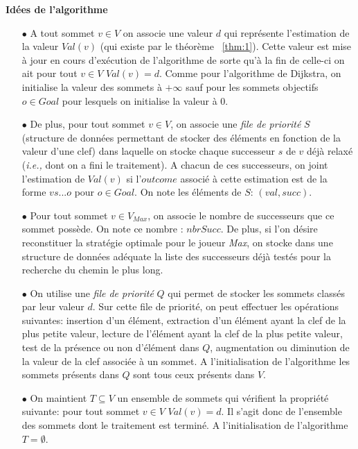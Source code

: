 \noindent \textbf{Idées de l'algorithme}\\

\begin{enumerate}
	
	\item[$\bullet$] A tout sommet $v \in V$ on associe une valeur $d$ qui représente l'estimation de la valeur $Val(v)$ (qui existe par le théorème ~\ref{thm:1}). Cette valeur est mise à jour en cours d'exécution de l'algorithme de sorte qu'à la fin de celle-ci on ait pour tout $v \in V$ $Val(v) = d$. Comme pour l'algorithme de Dijkstra, on initialise la valeur des sommets à $+\infty$ sauf pour les sommets objectifs $o \in Goal$ pour lesquels on initialise la valeur à 0.
	
	\item[$\bullet$] De plus, pour tout sommet $v \in V$, on associe une \textit{file de priorité} $S$ (structure de données permettant de stocker des éléments en fonction de la valeur d'une clef) dans laquelle on stocke chaque successeur $s$ de $v$ déjà relaxé (\emph{i.e.,} dont on a fini le traitement). A chacun de ces successeurs, on joint l'estimation de  $Val(v)$ si l'$outcome$ associé à cette estimation est de la forme $v s ... o$ pour $o \in Goal$. On note les éléments de $S$: $(val,succ)$.
	
	\item[$\bullet$] Pour tout sommet $v \in V_{Max}$, on associe le nombre de successeurs que ce sommet possède. On note ce nombre : $nbrSucc$. De plus, si l'on désire reconstituer la stratégie optimale pour le joueur \textit{Max}, on stocke dans une structure de données adéquate la liste des successeurs déjà testés pour la recherche du chemin le plus long.
	
		\item[$\bullet$] On utilise une \textit{file de priorité} $Q$ qui permet de stocker les sommets classés par leur valeur $d$. Sur cette file de priorité, on peut effectuer les opérations suivantes: insertion d'un élément, extraction d'un élément ayant la clef de la plus petite valeur, lecture de l'élément ayant la clef de la plus petite valeur, test de la présence ou non d'élément dans $Q$, augmentation ou diminution de la valeur de la clef associée à un sommet. A l'initialisation de l'algorithme les sommets présents dans $Q$ sont tous ceux présents dans $V$.
	
	\item[$\bullet$] On maintient $T \subseteq V$ un ensemble de sommets qui vérifient la propriété suivante: pour tout sommet $v \in V$ $Val(v) = d$. Il s'agit donc de l'ensemble des sommets dont le traitement est terminé. A l'initialisation de l'algorithme $T = \emptyset$.
	

\end{enumerate}
